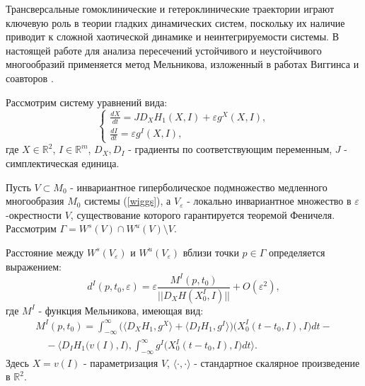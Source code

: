 Трансверсальные гомоклинические и гетероклинические траектории играют ключевую роль в теории гладких динамических систем, поскольку их наличие приводит к сложной хаотической динамике и неинтегрируемости системы. В настоящей работе для анализа пересечений устойчивого и неустойчивого многообразий применяется метод Мельникова, изложенный в работах Виггинса и соавторов \cite{wiggins}.

Рассмотрим систему уравнений вида:
\begin{equation}
    \begin{cases}
        \frac{dX}{dt} = J D_X H_1(X,I) + \varepsilon g^X(X,I), \\
        \frac{dI}{dt} = \varepsilon g^I(X,I),
    \end{cases}
    \label{wiggs}
\end{equation}
где $X \in \mathbb{R}^2$, $I \in \mathbb{R}^m$, $D_X, D_I$ - градиенты по соответствующим переменным, $J$ - симплектическая единица.

Пусть $V \subset M_0$ - инвариантное гиперболическое подмножество медленного многообразия $M_0$ системы (\ref{wiggs}), а $V_\varepsilon$ - локально инвариантное множество в $\varepsilon$-окрестности $V$, существование которого гарантируется теоремой Феничеля. Рассмотрим $\Gamma = W^s(V) \cap W^u(V) \setminus V$.

Расстояние между $W^s(V_\varepsilon)$ и $W^u(V_\varepsilon)$ вблизи точки $p \in \Gamma$ определяется выражением:
\begin{equation}
d^I(p, t_0, \varepsilon) = \varepsilon\frac{M^I(p,t_0)}{||D_X H(X_0^I, I)||} + O(\varepsilon^2),
\end{equation}
где $M^I$ - функция Мельникова, имеющая вид:
\begin{align*}
M^I(p,t_0) = \int_{- \infty}^{\infty} \Big( \langle D_X H_1, g^X \rangle + \langle D_I H_1, g^I \rangle \Big)\big(X_0^I(t-t_0,I), I \big)dt - \\
\quad - \langle D_I H_1 \big(v(I), I \big), \int_{- \infty}^{\infty} g^I \big(X_0^I(t-t_0,I), I \big)dt \rangle.
\end{align*}
Здесь $X = v(I)$ - параметризация $V$, $\langle \cdot, \cdot \rangle$ - стандартное скалярное произведение в $\mathbb{R}^2$.

